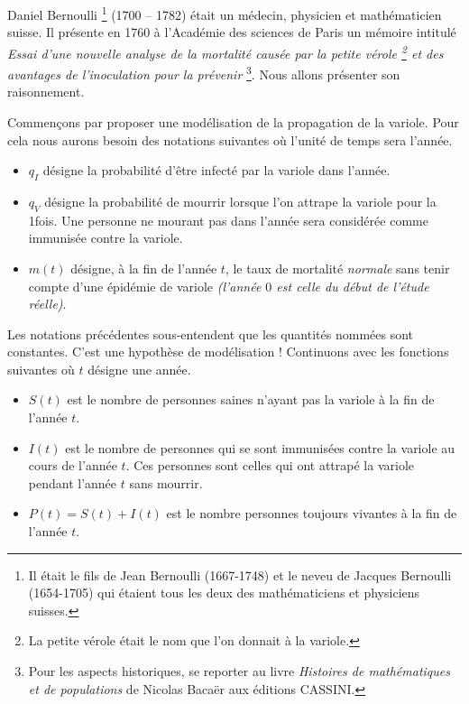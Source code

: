 Daniel Bernoulli
\footnote{
	Il était le fils de Jean Bernoulli (1667-1748) et le neveu de Jacques Bernoulli (1654-1705) qui étaient tous les deux des mathématiciens et physiciens suisses.
}
(1700 -- 1782) était un médecin, physicien et mathématicien suisse. Il présente en 1760 à l'Académie des sciences de Paris un mémoire intitulé \emph{\og Essai d'une nouvelle analyse de la mortalité causée par la petite vérole
\footnote{
	La petite vérole était le nom que l'on donnait à la variole.
}
et des avantages de l'inoculation pour la prévenir \fg}
\footnote{
	Pour les aspects historiques, se reporter au livre \emph{\og Histoires de mathématiques et de populations \fg} de Nicolas Bacaër aux éditions CASSINI.
}.
Nous allons présenter son raisonnement.




\medskip


Commençons par proposer une modélisation de la propagation de la variole. Pour cela nous aurons besoin des notations suivantes où l'unité de temps sera l'année.

\begin{itemize}[label=\small\textbullet]
	\item $q_I$ désigne la probabilité d'être infecté par la variole dans l'année.

	\item $q_V$ désigne la probabilité de mourrir lorsque l'on attrape la variole pour la 1\iere fois. Une personne ne mourant pas dans l'année sera considérée comme immunisée contre la variole.

	\item $m(t)$ désigne, à la fin de l'année $t$, le taux de mortalité \emph{\og normale \fg} sans tenir compte d'une épidémie de variole \emph{(l'année $0$ est celle du début de l'étude réelle)}. 
\end{itemize}

Les notations précédentes sous-entendent que les quantités nommées sont constantes. C'est une hypothèse de modélisation ! Continuons avec les fonctions suivantes où $t$ désigne une année.

\begin{itemize}[label=\small\textbullet]
	\item $S(t)$ est le nombre de personnes saines n'ayant pas la variole à la fin de l'année $t$.

	\item $I(t)$ est le nombre de personnes qui se sont immunisées contre la variole au cours de l'année $t$. Ces personnes sont celles qui ont attrapé la variole pendant l'année $t$ sans   mourrir.

	\item $P(t) = S(t) + I(t)$ est le nombre personnes toujours vivantes à la fin de l'année $t$. 
\end{itemize}


